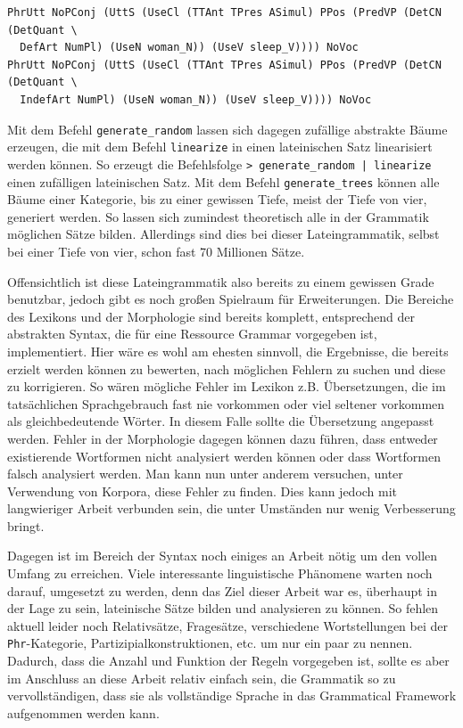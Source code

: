 \begin{lstlisting}[float=h!tp,caption={Abstrakte Syntaxrepräsentationen des Satzes \textit{feminae dormiunt}},label={GF-AbstractStrings},basicstyle=\small]
PhrUtt NoPConj (UttS (UseCl (TTAnt TPres ASimul) PPos (PredVP (DetCN (DetQuant \
  DefArt NumPl) (UseN woman_N)) (UseV sleep_V)))) NoVoc 
PhrUtt NoPConj (UttS (UseCl (TTAnt TPres ASimul) PPos (PredVP (DetCN (DetQuant \
  IndefArt NumPl) (UseN woman_N)) (UseV sleep_V)))) NoVoc
\end{lstlisting}
Mit dem Befehl \texttt{generate\_random} lassen sich dagegen zufällige abstrakte Bäume erzeugen, die mit dem Befehl \texttt{linearize} in einen lateinischen Satz linearisiert werden können. So erzeugt die Befehlsfolge \texttt{> generate\_random | linearize } einen zufälligen lateinischen Satz. Mit dem Befehl \texttt{generate\_trees} können alle Bäume einer Kategorie, bis zu einer gewissen Tiefe, meist der Tiefe von vier, generiert werden. So lassen sich zumindest theoretisch alle in der Grammatik möglichen Sätze bilden. Allerdings sind dies bei dieser Lateingrammatik, selbst bei einer Tiefe von vier, schon fast 70 Millionen Sätze. \par
Offensichtlich ist diese Lateingrammatik also bereits zu einem gewissen Grade benutzbar, jedoch gibt es noch großen Spielraum für Erweiterungen. Die Bereiche des Lexikons und der Morphologie sind bereits komplett, entsprechend der abstrakten Syntax, die für eine Ressource Grammar vorgegeben ist, implementiert. Hier wäre es wohl am ehesten sinnvoll, die Ergebnisse, die bereits erzielt werden können zu bewerten, nach möglichen Fehlern zu suchen und diese zu korrigieren. So wären mögliche Fehler im Lexikon z.B. Übersetzungen, die im tatsächlichen Sprachgebrauch fast nie vorkommen oder viel seltener vorkommen als gleichbedeutende Wörter. In diesem Falle sollte die Übersetzung angepasst werden. Fehler in der Morphologie dagegen können dazu führen, dass entweder existierende Wortformen nicht analysiert werden können oder dass Wortformen falsch analysiert werden. Man kann nun unter anderem versuchen, unter Verwendung von Korpora, diese Fehler zu finden. Dies kann jedoch mit langwieriger Arbeit verbunden sein, die unter Umständen nur wenig Verbesserung bringt. \par
Dagegen ist im Bereich der Syntax noch einiges an Arbeit nötig um den vollen Umfang zu erreichen. Viele interessante linguistische Phänomene warten noch darauf, umgesetzt zu werden, denn das Ziel dieser Arbeit war es, überhaupt in der Lage zu sein, lateinische Sätze bilden und analysieren zu können. So fehlen aktuell leider noch Relativsätze, Fragesätze, verschiedene Wortstellungen bei der \texttt{Phr}-Kategorie, Partizipialkonstruktionen, etc. um nur ein paar zu nennen. Dadurch, dass die Anzahl und Funktion der Regeln vorgegeben ist, sollte es aber im Anschluss an diese Arbeit relativ einfach sein, die Grammatik so zu vervollständigen, dass sie als vollständige Sprache in das Grammatical Framework aufgenommen werden kann. 
